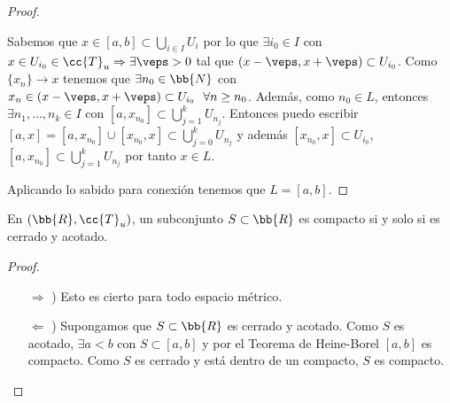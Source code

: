 \begin{teo}
\begin{proof}
\begin{enumerate}
            Sabemos que $x\in [a,b]\subset \bigcup\limits_{i\in I}U_i$ por lo que $\exists i_0\in I$ con $x\in U_{i_0}\in \cc{T}_u \Rightarrow \exists \veps >0$ tal que $(x-\veps, x+\veps)\subset U_{i_0}$. Como $\{x_n\}\to x$ tenemos que $\exists n_0\in \bb{N}$ con $x_n\in (x-\veps, x+\veps)\subset U_{i_0}\ \ \forall n\geq n_0$. Además, como $n_0\in L$, entonces $\exists n_1,\dots,n_k\in I$ con $[a,x_{n_0}]\subset \bigcup\limits_{j=1}^k U_{n_j}$. Entonces puedo escribir $[a,x]=[a,x_{n_0}]\cup[x_{n_0}, x]\subset \bigcup\limits_{j=0}^k U_{n_j}$ y además $[x_{n_0},x]\subset U_{i_0}$, $[a,x_{n_0}]\subset \bigcup\limits_{j=1}^k U_{n_j}$ por tanto $x\in L$.

        \end{enumerate}
        Aplicando lo sabido para conexión tenemos que $L=[a,b]$.

    \end{proof}
\end{teo}

\begin{coro}
    En $(\bb{R}, \cc{T}_u)$, un subconjunto $S\subset \bb{R}$ es compacto si y solo si es cerrado y acotado.
    \begin{proof}\
        \begin{itemize}
            \item[$\Rightarrow$ )] Esto es cierto para todo espacio métrico.
            \item[$\Leftarrow$ )] Supongamos que $S\subset \bb{R}$ es cerrado y acotado. Como $S$ es acotado, $\exists a<b$ con $S\subset [a,b]$ y por el Teorema de Heine-Borel $[a,b]$ es compacto. Como $S$ es cerrado y está dentro de un compacto, $S$ es compacto. 
        \end{itemize}
    \end{proof}
\end{coro}

